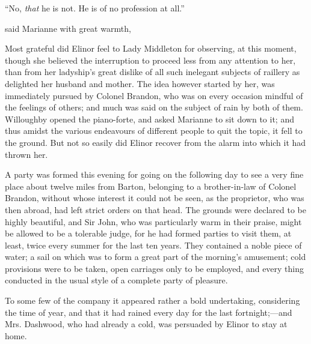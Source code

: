 
“No, {\em that} he is not. He is of no profession at all.”

 said Marianne with great warmth, 


Most grateful did Elinor feel to Lady Middleton for observing, at this moment,  though she believed the interruption to proceed less from any attention to her, than from her ladyship's great dislike of all such inelegant subjects of raillery as delighted her husband and mother. The idea however started by her, was immediately pursued by Colonel Brandon, who was on every occasion mindful of the feelings of others; and much was said on the subject of rain by both of them. Willoughby opened the piano-forte, and asked Marianne to sit down to it; and thus amidst the various endeavours of different people to quit the topic, it fell to the ground. But not so easily did Elinor recover from the alarm into which it had thrown her.

A party was formed this evening for going on the following day to see a very fine place about twelve miles from Barton, belonging to a brother-in-law of Colonel Brandon, without whose interest it could not be seen, as the proprietor, who was then abroad, had left strict orders on that head. The grounds were declared to be highly beautiful, and Sir John, who was particularly warm in their praise, might be allowed to be a tolerable judge, for he had formed parties to visit them, at least, twice every summer for the last ten years. They contained a noble piece of water; a sail on which was to form a great part of the morning's amusement; cold provisions were to be taken, open carriages only to be employed, and every thing conducted in the usual style of a complete party of pleasure.

To some few of the company it appeared rather a bold undertaking, considering the time of year, and that it had rained every day for the last fortnight;---and Mrs. Dashwood, who had already a cold, was persuaded by Elinor to stay at home.

\chapter{} %

